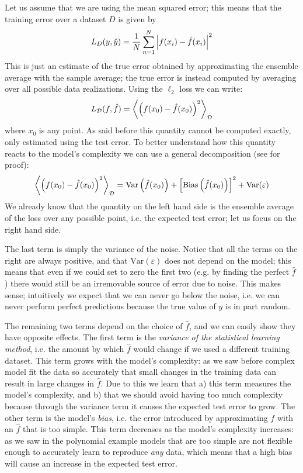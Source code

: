 Let us assume that we are using the mean squared error; this means that the training error over a dataset $D$ is given by
\begin{equation*}
    L_D(y, \hat{y}) = \frac{1}{N} \sum_{n=1}^N\abs{f(x_i)-\hat{f}(x_i)}^2
\end{equation*}
This is just an estimate of the true error obtained by approximating the ensemble average with the sample average; the true error is instead computed by averaging over all possible data realizations. Using the $\ell_2$ loss we can write:
\begin{equation*}
    L_\mathcal{D}(f, \hat{f}) = \expval{\left(f(x_0)-\hat{f}(x_0) \right)^2}_\mathcal{D}
\end{equation*}
where $x_0$ is any point. 
As said before this quantity cannot be computed exactly, only estimated using the test error. 
To better understand how this quantity reacts to the model's complexity we can use a general decomposition (see \cite{islp} for proof):
\begin{equation}
\label{eq:bias_variance_tradeoff}
    \expval{\left(f(x_0)-\hat{f}(x_0) \right)^2}_\mathcal{D} = \mathrm{Var}\left(\hat{f}(x_0)\right) + \left[\mathrm{Bias}\left(\hat{f}(x_0)\right)\right]^2 + \mathrm{Var}(\varepsilon)
\end{equation}
We already know that the quantity on the left hand side is the ensemble average of the loss over any possible point, i.e. the expected test error; let us focus on the right hand side.

The last term is simply the variance of the noise. Notice that all the terms on the right are always positive, and that $\mathrm{Var}(\varepsilon)$ does not depend on the model; this means that even if we could set to zero the first two (e.g. by finding the perfect $\hat{f}$) there would still be an irremovable source of error due to noise. This makes sense; intuitively we expect that we can never go below the noise, i.e. we can never perform perfect predictions because the true value of $y$ is in part random.

The remaining two terms depend on the choice of $\hat{f}$, and we can easily show they have opposite effects.
The first term is the \emph{variance of the statistical learning method}, i.e. the amount by which $\hat{f}$ would change if we used a different training dataset. This term grows with the model's complexity: as we saw before complex model fit the data so accurately that small changes in the training data can result in large changes in $\hat{f}$.
Due to this we learn that a) this term measures the model's complexity, and b) that we should avoid having too much complexity because through the variance term it causes the expected test error to grow.
The other term is the model's \emph{bias}, i.e. the error introduced by approximating $f$ with an $\hat{f}$ that is too simple. This term decreases as the model's complexity increases: as we saw in the  polynomial example models that are too simple are not flexible enough to accurately learn to reproduce \emph{any} data, which means that a high bias will cause an increase in the expected test error.

